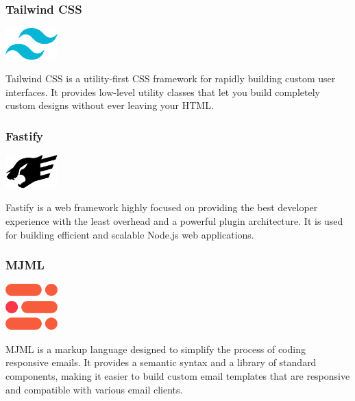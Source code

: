 \subsubsection*{Tailwind CSS}

\begin{center}
\includegraphics[width=0.15\textwidth]{Images/logos/tailwind.png}
\label{fig:tailwind}
\end{center}
Tailwind CSS is a utility-first CSS framework for rapidly building custom user interfaces. It provides low-level utility classes that let you build completely custom designs without ever leaving your HTML.

\subsubsection*{Fastify}

\begin{center}
\includegraphics[width=0.15\textwidth]{Images/logos/fastify.png}
\label{fig:fastify}
\end{center}
Fastify is a web framework highly focused on providing the best developer experience with the least overhead and a powerful plugin architecture. It is used for building efficient and scalable Node.js web applications.

\clearpage

\subsubsection*{MJML}

\begin{center}
\includegraphics[width=0.15\textwidth]{Images/logos/file-type-mjml.512x453.png}
\label{fig:MJML}
\end{center}
MJML is a markup language designed to simplify the process of coding responsive emails. It provides a semantic syntax and a library of standard components, making it easier to build custom email templates that are responsive and compatible with various email clients.

